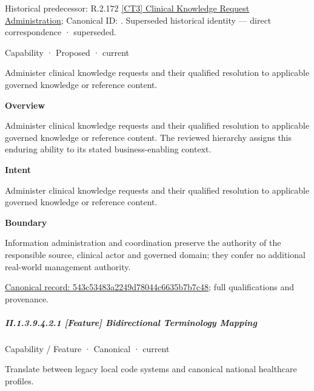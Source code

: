 {\small Historical predecessor: R.2.172 \hyperref[element:eb370c01fbdb4d22956d97e9ecd74b57]{[CT3] Clinical Knowledge Request Administration}; Canonical ID: \texttt{}. Superseded historical identity — direct correspondence · superseded.}\par
\label{element:543c53483a2249d78044c6635b7b7c48}
{\small Capability · Proposed · current}\par

Administer clinical knowledge requests and their qualified resolution to applicable governed knowledge or reference content.



\textbf{Overview}



Administer clinical knowledge requests and their qualified resolution to applicable governed knowledge or reference content. The reviewed hierarchy assigns this enduring ability to its stated business-enabling context.



\textbf{Intent}



Administer clinical knowledge requests and their qualified resolution to applicable governed knowledge or reference content.



\textbf{Boundary}



Information administration and coordination preserve the authority of the responsible source, clinical actor and governed domain; they confer no additional real-world management authority.


{\footnotesize \href{../../../../continuum/strategy/capability/543c53483a2249d78044c6635b7b7c48.md}{Canonical record: 543c53483a2249d78044c6635b7b7c48}; full qualifications and provenance.}\par
\subparagraph*{II.1.3.9.4.2.1 [Feature] Bidirectional Terminology Mapping}
\label{navigation:II.1.3.9.4.2.1}

\label{element:6134dc91af8d45e8b81cc28d18a5251f}
{\small Capability / Feature · Canonical · current}\par

Translate between legacy local code systems and canonical national healthcare profiles.



